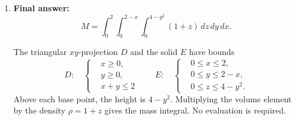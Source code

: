 \documentclass[12pt]{exam}
\begin{document}
\begin{enumerate}
\begin{center}
\begin{minipage}[t]{0.46\linewidth}
\textit{Original: two regions split at $x=1$.}
\end{minipage}\hfill
\begin{minipage}[t]{0.46\linewidth}
\centering
{}

\textit{Reversed: one slice, $y^2\leq x\leq2-y$.}
\end{minipage}
\end{center}

As a check, setting $f=1$ gives area $\tfrac23+\tfrac12=\tfrac76$ in the
original order, and $\int_0^1(2-y-y^2)\,dy=\tfrac76$ in the new order.

\item \textbf{Final answer:}
\[
  \boxed{M=\int_0^2\int_0^{2-x}\int_0^{4-y^2}(1+z)\,dz\,dy\,dx}.
\]

The triangular $xy$-projection $D$ and the solid $E$ have bounds
\[
  D:\quad
  \left\{
  \begin{aligned}
    &x\geq0,\\
    &y\geq0,\\
    &x+y\leq2
  \end{aligned}
  \right.
  \qquad
  E:\quad
  \left\{
  \begin{aligned}
    &0\leq x\leq2,\\
    &0\leq y\leq2-x,\\
    &0\leq z\leq4-y^2.
  \end{aligned}
  \right.
\]
Above each base point, the height is $4-y^2$. Multiplying the volume element
by the density $\rho=1+z$ gives the mass integral. No evaluation is required.


\end{enumerate}
\end{document}
